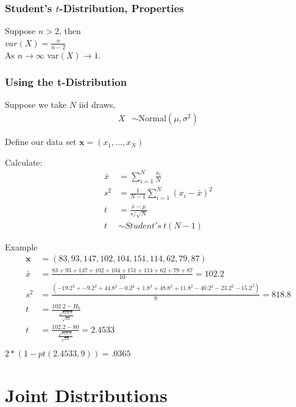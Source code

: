 \documentclass[aspectratio=169, handout]{beamer}
\numberwithin{equation}{section}
\begin{document}
\begin{frame}
\frametitle{Student's $t$-Distribution, Properties}

Suppose $n>2$, then \\
$var(X) = \frac{n}{n-2}$ \\
As $n \rightarrow \infty$ var$(X) \rightarrow 1$.  



\end{frame}



\begin{frame}
\frametitle{Using the t-Distribution}
Suppose we take $N$ iid draws, 
\begin{align*}
X & \sim  \text{Normal}(\mu, \sigma^2) 
\end{align*}

Define our data set $\boldsymbol{x} = (x_{1}, \hdots, x_{N})$

Calculate:
\begin{align*}
 \bar{x} & =   \sum_{i=1}^{N} \frac{x_{i}}{N} \\
 s^2 & =  \frac{1}{N-1} \sum_{i=1}^{N} (x_{i} - \bar{x})^2\\
t & =  \frac{\bar{x} - \mu}{s/\sqrt{N}}  \\
t & \sim Student's\ t(N-1) 
\end{align*}
\end{frame}

\begin{frame}{Example}
\begin{align*}
\boldsymbol{x}&=(83, 93, 147, 102, 104, 151, 114, 62, 79, 87)\\
\bar{x}&=\frac{83 + 93 + 147+ 102+ 104+ 151+ 114+ 62+79+ 87}{10}=102.2\\
s^2&=\frac{(-19.2^2+ -9.2^2+ 44.8^2 -0.2^2 +1.8^2+ 48.8^2+ 11.8^2-40.2^2  -23.2^2 -15.2^2)}{9}=818.8\\
t&=\frac{102.2-H_0}{\frac{\sqrt{818.8}}{\sqrt{10}}}\\
t&=\frac{102.2-80}{\frac{\sqrt{818.8}}{\sqrt{10}}}=2.4533\\
\end{align*}
$2*(1-pt(2.4533,9))=.0365$
\end{frame}



\section{Joint Distributions}
\end{document}
